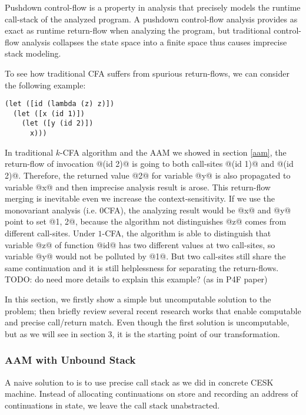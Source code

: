 \documentclass[acmsmall,review,anonymous]{acmart}\settopmatter{printfolios=true,printccs=false,printacmref=false}
\begin{document}
Pushdown control-flow is a property in analysis that precisely models
the runtime call-stack of the analyzed program. 
A pushdown control-flow analysis provides as exact as runtime return-flow 
when analyzing the program, but traditional control-flow analysis collapses 
the state space into a finite space thus causes imprecise stack modeling.

To see how traditional CFA suffers from spurious return-flows, 
we can consider the following example:

\begin{lstlisting}
(let ([id (lambda (z) z)])
  (let ([x (id 1)])
    (let ([y (id 2)])
      x)))
\end{lstlisting}

In traditional $k$-CFA algorithm and the AAM we showed in section \ref{aam}, 
the return-flow of invocation @(id 2)@
is going to both call-sites @(id 1)@ and @(id 2)@. Therefore, the
returned value @2@ for variable @y@ is also propagated to 
variable @x@ and then imprecise analysis result is arose.
This return-flow merging is inevitable even we increase the context-sensitivity.
If we use the monovariant analysis (i.e. 0CFA), the analyzing result would be @x@ and 
@y@ point to set @{1, 2}@, because the algorithm not distinguishes
@z@ comes from different call-sites.
Under $1$-CFA, the algorithm is able to distinguish that variable @z@ of function
@id@ has two different values at two call-sites, so variable @y@ 
would not be polluted by @1@. 
But two call-sites still share the same continuation and
it is still helplessness for separating the return-flows.
TODO: do need more details to explain this example? (as in P4F paper)

In this section, we firstly show a simple but uncomputable solution to the
problem; then briefly review several recent research works that enable
computable and precise call/return match. Even though the first solution is
uncomputable, but as we will see in section 3, it is the starting point of our
transformation. 

\subsubsection{AAM with Unbound Stack}

A naive solution to is to use precise call stack as we did in concrete
CESK machine. Instead of allocating continuations on store and recording an 
address of continuations in state, we leave the call stack unabstracted. 
\end{document}
